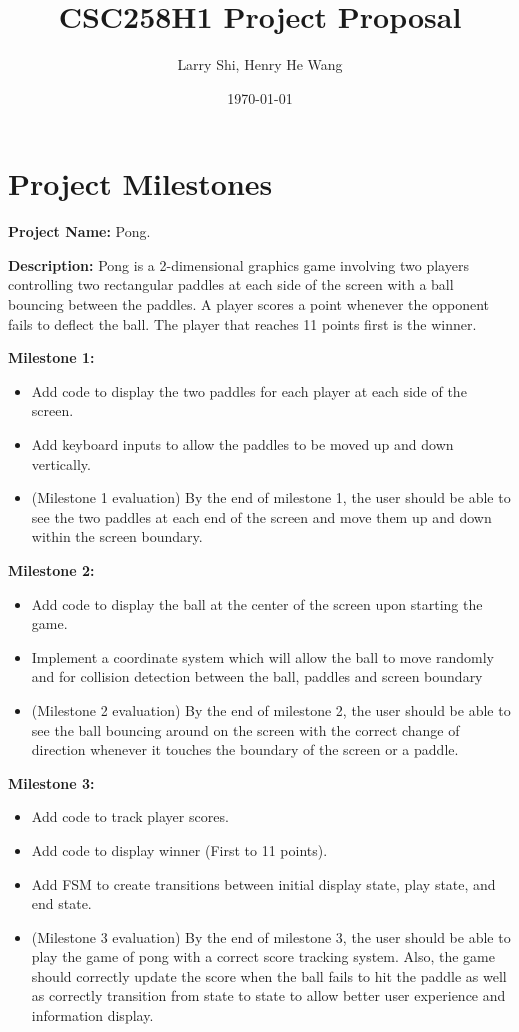 \documentclass[12pt]{article}
\title{CSC258H1 Project Proposal}
\author{Larry Shi, Henry He Wang}
\date{\today}
\begin{document}
\maketitle

\onehalfspacing
\setlength\parindent{0pt}

\section*{Project Milestones}

\textbf{Project Name:} Pong.

\textbf{Description:} Pong is a 2-dimensional graphics game involving two players controlling two rectangular paddles at each side of the screen with a ball bouncing between the paddles. A player scores a point whenever the opponent fails to deflect the ball. The player that reaches 11 points first is the winner.

\singlespacing

\textbf{Milestone 1:}
\begin{itemize}
	\item Add code to display the two paddles for each player at each side of the screen.
    \item Add keyboard inputs to allow the paddles to be moved up and down vertically.
    \item (Milestone 1 evaluation) By the end of milestone 1, the user should be able to see the two paddles at each end of the screen and move them up and down within the screen boundary.
\end{itemize}

\textbf{Milestone 2:}
\begin{itemize}
	\item Add code to display the ball at the center of the screen upon starting the game.
    \item Implement a coordinate system which will allow the ball to move randomly and for collision detection between the ball, paddles and screen boundary
	\item (Milestone 2 evaluation) By the end of milestone 2, the user should be able to see the ball bouncing around on the screen with the correct change of direction whenever it touches the boundary of the screen or a paddle.
\end{itemize}

\textbf{Milestone 3:}
\begin{itemize}
	\item Add code to track player scores.
	\item Add code to display winner (First to 11 points).
	\item Add FSM to create transitions between initial display state, play state, and end state.
	\item (Milestone 3 evaluation) By the end of milestone 3, the user should be able to play the game of pong with a correct score tracking system. Also, the game should correctly update the score when the ball fails to hit the paddle as well as correctly transition from state to state to allow better user experience and information display.
\end{itemize}
\end{document}
